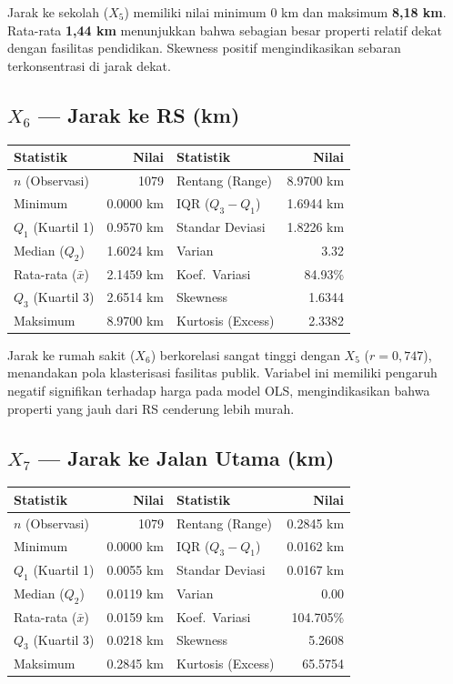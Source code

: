 \documentclass[12pt,a4paper]{article}
\begin{document}
\noindent Jarak ke sekolah ($X_5$) memiliki nilai minimum 0 km dan maksimum \textbf{8,18 km}. Rata-rata \textbf{1,44 km} menunjukkan bahwa sebagian besar properti relatif dekat dengan fasilitas pendidikan. Skewness positif mengindikasikan sebaran terkonsentrasi di jarak dekat.


\subsection{\texorpdfstring{$X_6$}{X6} --- Jarak ke RS (km)}
\begin{center}
\begin{tabular}{|l|r||l|r|}
\hline
\textbf{Statistik} & \textbf{Nilai} & \textbf{Statistik} & \textbf{Nilai} \\
\hline
$n$ (Observasi) & 1079 & Rentang (Range) & 8.9700 km \\
Minimum & 0.0000 km & IQR ($Q_3 - Q_1$) & 1.6944 km \\
$Q_1$ (Kuartil 1) & 0.9570 km & Standar Deviasi & 1.8226 km \\
Median ($Q_2$) & 1.6024 km & Varian & 3.32 \\
Rata-rata ($\bar{x}$) & 2.1459 km & Koef.~Variasi & 84.93\% \\
$Q_3$ (Kuartil 3) & 2.6514 km & Skewness & 1.6344 \\
Maksimum & 8.9700 km & Kurtosis (Excess) & 2.3382 \\
\hline
\end{tabular}
\end{center}

\noindent Jarak ke rumah sakit ($X_6$) berkorelasi sangat tinggi dengan $X_5$ ($r=0{,}747$), menandakan pola klasterisasi fasilitas publik. Variabel ini memiliki pengaruh negatif signifikan terhadap harga pada model OLS, mengindikasikan bahwa properti yang jauh dari RS cenderung lebih murah.


\subsection{\texorpdfstring{$X_7$}{X7} --- Jarak ke Jalan Utama (km)}
\begin{center}
\begin{tabular}{|l|r||l|r|}
\hline
\textbf{Statistik} & \textbf{Nilai} & \textbf{Statistik} & \textbf{Nilai} \\
\hline
$n$ (Observasi) & 1079 & Rentang (Range) & 0.2845 km \\
Minimum & 0.0000 km & IQR ($Q_3 - Q_1$) & 0.0162 km \\
$Q_1$ (Kuartil 1) & 0.0055 km & Standar Deviasi & 0.0167 km \\
Median ($Q_2$) & 0.0119 km & Varian & 0.00 \\
Rata-rata ($\bar{x}$) & 0.0159 km & Koef.~Variasi & 104.705\% \\
$Q_3$ (Kuartil 3) & 0.0218 km & Skewness & 5.2608 \\
Maksimum & 0.2845 km & Kurtosis (Excess) & 65.5754 \\
\hline
\end{tabular}
\end{center}
\end{document}
